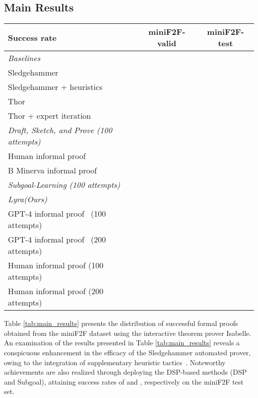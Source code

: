 \documentclass{article} \usepackage{iclr2024_conference,times}
\def\miniff{miniF2F\xspace}
\def\shortname{Lyra\xspace}
\begin{document}
\subsection{Main Results}
\begin{table*}[t]
\begin{center}
\caption{
\small
\textbf{Proving success rates on the \miniff dataset with Isabelle.} 
The table displays the success rates of previous works and the \shortname, using both human and GPT-4 informal proofs. The highest success rates for each set are highlighted in bold.
}
\label{tab:main_results} \small
\begin{tabular}{lcc}
    \toprule
    Success rate & \miniff-valid & \miniff-test\\
    \midrule
    \multicolumn{1}{l}{\textit{Baselines}} \\
    \midrule
    Sledgehammer~\citep{paulson2010three}              &  &  \\
    Sledgehammer + heuristics~\citep{jiang2023draft} &  &  \\
    Thor~\citep{jiang2022thor} &  &  \\
    Thor + expert iteration~\citep{wu2022autoformalization} &  &  \\
    \midrule
    \multicolumn{1}{l}{\textit{Draft, Sketch, and Prove (100 attempts)}}~\citep{jiang2023draft} \\
    \midrule
    Human informal proof    &  &  \\
    B Minerva informal proof &  &  \\
    \midrule
     \textit{Subgoal-Learning (100 attempts)}~\citep{zhao2023decomposing}   &  &  \\
    \midrule
    \multicolumn{1}{l}{\textit{\shortname (Ours)}} \\
    \midrule
    GPT-4 informal proof ~(100 attempts)  &  &  \\
    GPT-4 informal proof ~(200 attempts)  &  &  \\
    Human informal proof (100 attempts)   &  &  \\
    Human informal proof (200 attempts)   &  &  \\
   
    \bottomrule
\end{tabular}
\end{center}
\vspace{-0.1in}
\end{table*}
Table \ref{tab:main_results} presents the distribution of successful formal proofs obtained from the miniF2F dataset using the interactive theorem prover Isabelle. An examination of the results presented in Table \ref{tab:main_results} reveals a conspicuous enhancement in the efficacy of the Sledgehammer automated prover, owing to the integration of  supplementary heuristic tactics~\citep{jiang2023draft}. Noteworthy achievements are also realized through deploying the DSP-based methods (DSP and Subgoal), attaining success rates of  and , respectively on the miniF2F test set.
\end{document}
